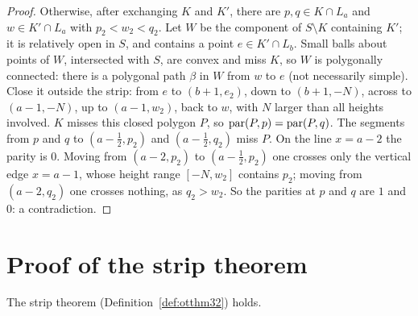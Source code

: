 \begin{proof}
Otherwise, after exchanging $K$ and $K'$, there are $p,q\in K\cap L_a$ and $w\in K'\cap L_a$ with $p_2<w_2<q_2$. Let $W$ be the component of $S\setminus K$ containing $K'$;
it is relatively open in $S$, and contains a point $e\in K'\cap L_b$. Small balls about points of $W$, intersected with $S$, are convex and miss $K$, so $W$ is
polygonally connected: there is a polygonal path $\beta$ in $W$ from $w$ to $e$ (not necessarily simple). Close it outside the strip: from $e$ to $(b+1,e_2)$, down to
$(b+1,-N)$, across to $(a-1,-N)$, up to $(a-1,w_2)$, back to $w$, with $N$ larger than all heights involved. $K$ misses this closed polygon $P$, so $\operatorname{par}(P,p)=\operatorname{par}(P,q)$.
The segments from $p$ and $q$ to $(a-\frac12,p_2)$ and $(a-\frac12,q_2)$ miss $P$. On the line $x=a-2$ the parity is $0$. Moving from $(a-2,p_2)$ to $(a-\frac12,p_2)$
one crosses only the vertical edge $x=a-1$, whose height range $[-N,w_2]$ contains $p_2$; moving from $(a-2,q_2)$ one crosses nothing, as $q_2>w_2$. So the parities at
$p$ and $q$ are $1$ and $0$: a contradiction.
\end{proof}


\section{Proof of the strip theorem}

\begin{theorem}\label{thm:ot32}
The strip theorem (Definition~\ref{def:otthm32}) holds.
\end{theorem}

